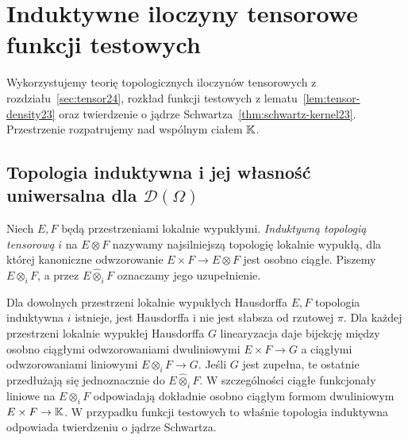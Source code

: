 
\section{Induktywne iloczyny tensorowe funkcji testowych}
\label{sec:dt-test-tensor}
\providecommand{\atlasref}[2]{#2}

Wykorzystujemy teorię topologicznych iloczynów tensorowych
z rozdziału~\ref{sec:tensor24}, rozkład funkcji testowych
z lematu~\ref{lem:tensor-density23} oraz twierdzenie
o jądrze Schwartza~\ref{thm:schwartz-kernel23}.
Przestrzenie rozpatrujemy nad wspólnym ciałem $\mathbb K$.

\subsection{Topologia induktywna i jej własność uniwersalna dla \texorpdfstring{$\mathcal D(\Omega)$}{D(Omega)}}

\begin{definicja}
\label{def:i-topology24}
Niech $E,F$ będą przestrzeniami lokalnie wypukłymi.
\emph{Induktywną topologią tensorową} $i$ na $E\otimes F$
nazywamy najsilniejszą topologię lokalnie wypukłą,
dla której kanoniczne odwzorowanie
$E\times F\to E\otimes F$ jest osobno ciągłe.
Piszemy $E\otimes_i F$, a przez
$E\widehat\otimes_i F$ oznaczamy jego uzupełnienie.
\end{definicja}

\begin{stwierdzenie}
\label{prop:i-vs-pi24}
Dla dowolnych przestrzeni lokalnie wypukłych Hausdorffa
$E,F$ topologia induktywna $i$ istnieje, jest Hausdorffa
i nie jest słabsza od rzutowej $\pi$.
Dla każdej przestrzeni lokalnie wypukłej Hausdorffa $G$
linearyzacja daje bijekcję między osobno ciągłymi
odwzorowaniami dwuliniowymi $E\times F\to G$
a ciągłymi odwzorowaniami liniowymi $E\otimes_i F\to G$.
Jeśli $G$ jest zupełna, te ostatnie przedłużają się
jednoznacznie do $E\widehat\otimes_i F$.
W szczególności ciągłe funkcjonały liniowe na
$E\otimes_i F$ odpowiadają dokładnie osobno ciągłym
formom dwuliniowym $E\times F\to\mathbb K$. W przypadku
funkcji testowych to właśnie topologia induktywna
odpowiada twierdzeniu o jądrze Schwartza.
\end{stwierdzenie}


